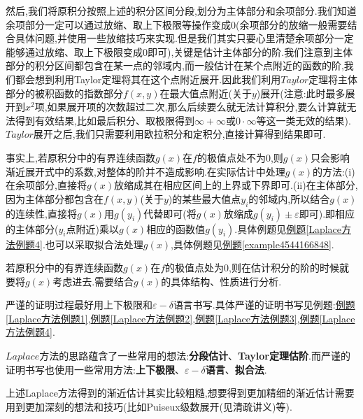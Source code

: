 \documentclass[../../main.tex]{subfiles}%
\begin{document}
然后,我们将原积分按照上述的积分区间分段,划分为主体部分和余项部分.我们知道余项部分一定可以通过放缩、取上下极限等操作变成0(余项部分的放缩一般需要结合具体问题,并使用一些放缩技巧来实现.但是我们其实只要心里清楚余项部分一定能够通过放缩、取上下极限变成0即可),关键是估计主体部分的阶.我们注意到主体部分的积分区间都包含在某一点的邻域内,而一般估计在某个点附近的函数的阶,我们都会想到利用Taylor定理将其在这个点附近展开.因此我们利用$Taylor$定理将主体部分的被积函数的指数部分$f(x,y)$在最大值点附近(关于$y$)展开(注意:此时最多展开到$x^2$项,如果展开项的次数超过二次,那么后续要么就无法计算积分,要么计算就无法得到有效结果,比如最后积分、取极限得到$\infty+\infty$或$0\cdot \infty$等这一类无效的结果).
$Taylor$展开之后,我们只需要利用欧拉积分和定积分,直接计算得到结果即可.

事实上,若原积分中的有界连续函数$g(x)$在$f$的极值点处不为$0$,则$g(x)$只会影响渐近展开式中的系数,对整体的阶并不造成影响.在实际估计中处理$g(x)$的方法:(i)在余项部分,直接将$g(x)$放缩成其在相应区间上的上界或下界即可.(ii)在主体部分,因为主体部分都包含在$f(x,y)$(关于$y$)的某些最大值点$y_i$的邻域内,所以结合$g(x)$的连续性,直接将$g(x)$用$g(y_i)$代替即可(将$g(x)$放缩成$g(y_i)\pm \varepsilon$即可).即相应的主体部分($y_i$点附近)乘以$g(x)$相应的函数值$g(y_i)$.具体例题见\hyperref[Laplace方法例题4]{例题\ref{Laplace方法例题4}}.也可以采取拟合法处理$g(x)$,具体例题见\hyperref[example4544166848]{例题\ref{example4544166848}}.

若原积分中的有界连续函数$g(x)$在$f$的极值点处为$0$,则在估计积分的阶的时候就要将$g(x)$考虑进去.需要结合$g(x)$的具体结构、性质进行分析.

严谨的证明过程最好用上下极限和$\varepsilon-\delta$语言书写.具体严谨的证明书写见例题:\hyperref[Laplace方法例题1]{例题\ref{Laplace方法例题1}},\hyperref[Laplace方法例题2]{例题\ref{Laplace方法例题2}},\hyperref[Laplace方法例题3]{例题\ref{Laplace方法例题3}},\hyperref[Laplace方法例题4]{例题\ref{Laplace方法例题4}}.
\begin{note}
$Laplace$方法的思路蕴含了一些常用的想法:\textbf{分段估计}、\textbf{Taylor定理估阶}.而严谨的证明书写也使用一些常用方法:\textbf{上下极限}、\textbf{$\varepsilon-\delta$语言}、\textbf{拟合法}.
\end{note}
\begin{remark}
上述Laplace方法得到的渐近估计其实比较粗糙,想要得到更加精细的渐近估计需要用到更加深刻的想法和技巧(比如Puiseux级数展开(见清疏讲义)等).
\end{remark}
\end{document}
